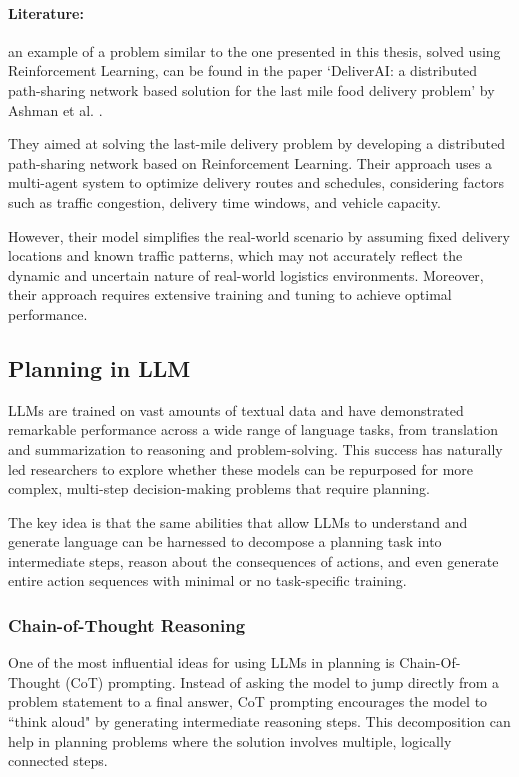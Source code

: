 \paragraph{Literature:}
an example of a problem similar to the one presented in this thesis, solved using
Reinforcement Learning, can be found in the paper `DeliverAI: a distributed path-sharing
network based solution for the last mile food delivery problem' by Ashman et al.
\cite{mehra2024deliveraireinforcementlearningbased}.

They aimed at solving the last-mile delivery problem by developing a distributed
path-sharing network based on Reinforcement Learning. Their approach uses a multi-agent
system to optimize delivery routes and schedules, considering factors such as
traffic congestion, delivery time windows, and vehicle capacity.

However, their model simplifies the real-world scenario by assuming fixed delivery
locations and known traffic patterns, which may not accurately reflect the
dynamic and uncertain nature of real-world logistics environments. Moreover,
their approach requires extensive training and tuning to achieve optimal
performance.

\subsection{Planning in LLM}
\label{sub:planning_in_llm}

LLMs are trained on vast amounts of textual data and have demonstrated remarkable
performance across a wide range of language tasks, from translation and
summarization to reasoning and problem-solving. This success has naturally led researchers
to explore whether these models can be repurposed for more complex, multi-step
decision-making problems that require planning.

The key idea is that the same abilities that allow LLMs to understand and
generate language can be harnessed to decompose a planning task into
intermediate steps, reason about the consequences of actions, and even generate
entire action sequences with minimal or no task-specific training.

\subsubsection{Chain-of-Thought Reasoning}

One of the most influential ideas for using LLMs in planning is Chain-Of-Thought
(CoT) prompting. Instead of asking the model to jump directly from a problem
statement to a final answer, CoT prompting encourages the model to ``think aloud"
by generating intermediate reasoning steps. This decomposition can help in planning
problems where the solution involves multiple, logically connected steps.

